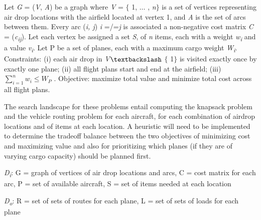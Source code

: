\documentclass[12pt]{article}
\renewcommand{\_}{\kern-1.5pt\textunderscore\kern-1.5pt}
\begin{document}
Let \textit{G} = (\textit{V}, \textit{A}) be a graph where \textit{V} = $ \{ $ 1, $ \ldots $ , \textit{n}$ \} $  is a set of vertices representing air drop locations with the airfield located at vertex 1, and \textit{A} is the set of arcs between them. Every arc (\textit{i, j}) \textit{i} =/=\textit{j} is associated a non-negative cost matrix \textit{C} = (\textit{c\textsubscript{ij}}). Let each vertex be assigned a set \textit{S},\textit{ }of \textit{n} items, each with a weight \textit{w\textsubscript{i}} and a value \textit{v\textsubscript{i}}. Let P be a set of planes, each with a maximum cargo weight \textit{W\textsubscript{i}}. Constraints:  (i) each air drop in \textit{V}$\textbackslash$ $ \{ $ 1$ \} $  is visited exactly once by exactly one plane; (ii) all flight plans start and end at the airfield; (iii)  \(  \sum _{i=1}^{n}w_{i}  \leq W_{P} \) . Objective: maximize total value and minimize total cost across all flight plans.\par

\tab The search landscape for these problems entail computing the knapsack problem and the vehicle routing problem for each aircraft, for each combination of airdrop locations and of items at each location. A heuristic will need to be implemented to determine the tradeoff balance between the two objectives of minimizing cost and maximizing value and also for prioritizing which planes (if they are of varying cargo capacity) should be planned first.\par

\textit{D\textsubscript{i}}: G = graph of vertices of air drop locations and arcs, C = cost matrix for each arc, P = set of available aircraft, S = set of items needed at each location\par

\textit{D\textsubscript{o}}: R = set of sets of routes for each plane, L = set of sets of loads for each plane\par


\printbibliography
\end{document}
